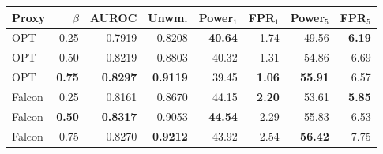 \begin{tabular}{@{}lrrrrrrr@{}}
\toprule
Proxy & $\beta$ & AUROC & Unwm. & Power$_1$ & FPR$_1$ & Power$_5$ & FPR$_5$ \\
\midrule
OPT & 0.25 & 0.7919 & 0.8208 & \textbf{40.64} & 1.74 & 49.56 & \textbf{6.19} \\
OPT & 0.50 & 0.8219 & 0.8803 & 40.32 & 1.31 & 54.86 & 6.69 \\
OPT & \textbf{0.75} & \textbf{0.8297} & \textbf{0.9119} & 39.45 & \textbf{1.06} & \textbf{55.91} & 6.57 \\
Falcon & 0.25 & 0.8161 & 0.8670 & 44.15 & \textbf{2.20} & 53.61 & \textbf{5.85} \\
Falcon & \textbf{0.50} & \textbf{0.8317} & 0.9053 & \textbf{44.54} & 2.29 & 55.83 & 6.53 \\
Falcon & 0.75 & 0.8270 & \textbf{0.9212} & 43.92 & 2.54 & \textbf{56.42} & 7.75 \\
\bottomrule
\end{tabular}
